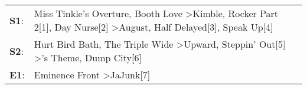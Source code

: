 \begin{supertabular}{p{0.03\textwidth}p{0.92\textwidth}}
 \textbf{S1}:  &  Miss Tinkle's Overture\textsuperscript{}, \enspace Booth Love\textsuperscript{} \textgreater \enspace Kimble\textsuperscript{}, \enspace Rocker Part 2[1]\textsuperscript{}, \enspace Day Nurse[2]\textsuperscript{} \textgreater \enspace August\textsuperscript{}, \enspace Half Delayed[3]\textsuperscript{}, \enspace Speak Up[4]\textsuperscript{}  \enspace  \\
 \textbf{S2}:  &                                                                                      Hurt Bird Bath\textsuperscript{}, \enspace The Triple Wide\textsuperscript{} \textgreater \enspace Upward\textsuperscript{}, \enspace Steppin' Out[5]\textsuperscript{} \textgreater {}'s Theme\textsuperscript{}, \enspace Dump City[6]\textsuperscript{}  \enspace  \\
 \textbf{E1}:  &                                                                                                                                                                                                                                                                       Eminence Front\textsuperscript{} \textgreater \enspace JaJunk[7]\textsuperscript{}  \enspace  \\
\end{supertabular}
